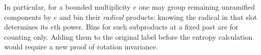 In particular, for a bounded multiplicity $e$ one may group
remaining unramified components by $e$ and bin their \emph{radical}
products: knowing the radical in that slot determines its $e$th
power. Bins for such subproducts at a fixed past are for counting
only. Adding them to the original label before the entropy
calculation would require a new proof of rotation invariance.
